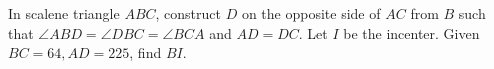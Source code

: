 In scalene triangle $ABC$, construct $D$ on the opposite side of $AC$ from $B$ such that $\angle ABD=\angle DBC=\angle BCA$ and $AD=DC$. Let $I$ be the incenter. Given $BC=64,AD=225$, find $BI$.
